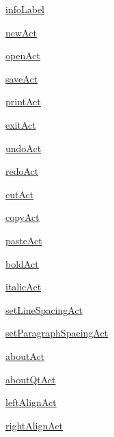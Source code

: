 \begin{DoxyCompactItemize}
\item 
\hyperlink{classmenus_1_1MainWindow_ab99082155cb902f0246c9fe52229b946}{info\+Label}
\item 
\hyperlink{classmenus_1_1MainWindow_ae8ab2313f49bb5e288b73b9b136b6d8f}{new\+Act}
\item 
\hyperlink{classmenus_1_1MainWindow_a6f512f28b7f615bcbb866530c8b12112}{open\+Act}
\item 
\hyperlink{classmenus_1_1MainWindow_a3bdc6bc4e5fa867e63886bb5b435a486}{save\+Act}
\item 
\hyperlink{classmenus_1_1MainWindow_ad842384a6fb52e73d89ad90fd7672ac5}{print\+Act}
\item 
\hyperlink{classmenus_1_1MainWindow_a2890de97f28e88f8c10dcf233b78bc05}{exit\+Act}
\item 
\hyperlink{classmenus_1_1MainWindow_a2e6f800d24293615ee092290167cf106}{undo\+Act}
\item 
\hyperlink{classmenus_1_1MainWindow_ad19412edaeee92c995cd1424385a71d6}{redo\+Act}
\item 
\hyperlink{classmenus_1_1MainWindow_a1e21950c475acf97c34f73887fa5aaf5}{cut\+Act}
\item 
\hyperlink{classmenus_1_1MainWindow_ae092fcf3e86b61fea0e8525905eb685d}{copy\+Act}
\item 
\hyperlink{classmenus_1_1MainWindow_a532bc0a49d0bef632f9f8a11d945a656}{paste\+Act}
\item 
\hyperlink{classmenus_1_1MainWindow_a4621bb4c3b48ab7b8a85e11f3686abaf}{bold\+Act}
\item 
\hyperlink{classmenus_1_1MainWindow_a6135a1fd32dfd706a05c500d1cb17d22}{italic\+Act}
\item 
\hyperlink{classmenus_1_1MainWindow_a0527cb1817a3180971fb399bade24b35}{set\+Line\+Spacing\+Act}
\item 
\hyperlink{classmenus_1_1MainWindow_a6056d26a7df5941a4f0549a034ebbe24}{set\+Paragraph\+Spacing\+Act}
\item 
\hyperlink{classmenus_1_1MainWindow_a8a4bd7df69801fd3dfef28dea54f1ea5}{about\+Act}
\item 
\hyperlink{classmenus_1_1MainWindow_ab34726c87c16b0e571a63c6283cd86d3}{about\+Qt\+Act}
\item 
\hyperlink{classmenus_1_1MainWindow_a006e248811426fd6f90a1a9fd15503ab}{left\+Align\+Act}
\item 
\hyperlink{classmenus_1_1MainWindow_a89b45c1714690484cdb9af431bd01580}{right\+Align\+Act}
\item 

\end{DoxyCompactItemize}
